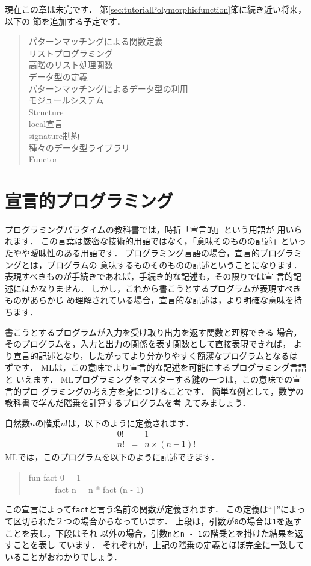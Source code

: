 \documentclass{jbook}
\begin{document}
	現在この章は未完です．
	第\ref{sec:tutorialPolymorphicfunction}節に続き近い将来，以下の
節を追加する予定です．
\begin{quote}
パターンマッチングによる関数定義\\
リストプログラミング\\
高階のリスト処理関数\\
データ型の定義\\
パターンマッチングによるデータ型の利用\\
モジュールシステム\\
Structure\\
local宣言\\
signature制約\\
種々のデータ型ライブラリ\\
Functor
\end{quote}

\section{宣言的プログラミング}
\label{sec:tutorialDeclarative}

	プログラミングパラダイムの教科書では，時折「宣言的」という用語が
用いられます．
	この言葉は厳密な技術的用語ではなく，「意味そのものの記述」といっ
たやや曖昧性のある用語です．
	プログラミング言語の場合，宣言的プログラミングとは，プログラムの
意味するものそのものの記述ということになります．
	表現すべきものが手続きであれば，手続き的な記述も，その限りでは宣
言的記述にほかなりません．
	しかし，これから書こうとするプログラムが表現すべきものがあらかじ
め理解されている場合，宣言的な記述は，より明確な意味を持ちます．
	
	書こうとするプログラムが入力を受け取り出力を返す関数と理解できる
場合，そのプログラムを，入力と出力の関係を表す関数として直接表現できれば，
より宣言的記述となり，したがってより分かりやすく簡潔なプログラムとなるは
ずです．
	MLは，この意味でより宣言的な記述を可能にするプログラミング言語と
いえます．
	MLプログラミングをマスターする鍵の一つは，この意味での宣言的プロ
グラミングの考え方を身につけることです．
	簡単な例として，数学の教科書で学んだ階乗を計算するプログラムを考
えてみましょう．

	自然数$n$の階乗$n !$は，以下のように定義されます．
\begin{eqnarray*}
0 ! &=& 1
\\
n ! &=& n \times (n - 1) !
\end{eqnarray*}
	MLでは，このプログラムを以下のように記述できます．
\begin{tt}
\begin{quote}
fun fact 0 = 1\\
\ \ \ \ \ | fact n = n * fact (n - 1)
\end{quote}
\end{tt}
	この宣言によって{\tt fact}と言う名前の関数が定義されます．
	この定義は``{\tt |}''によって区切られた２つの場合からなっています．
	上段は，引数が{\tt 0}の場合は{\tt 1}を返すことを表し，下段はそれ
以外の場合，引数{\tt n}と{\tt n - 1}の階乗とを掛けた結果を返すことを表し
ています．
	それぞれが，上記の階乗の定義とほぼ完全に一致していることがおわかりでしょう．
	
\end{document}
